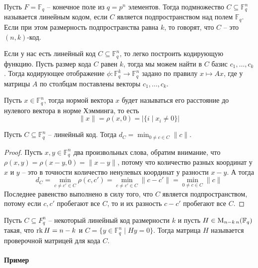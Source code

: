 \begin{definition}
Пусть $F = \mathbb F_q$ -- конечное поле из $q = p^n$ элементов.
Тогда подмножество $C\subseteq \mathbb F_q^n$ называется линейным кодом, если $C$ является подпространством над полем $\mathbb F_q$.
Если при этом размерность подпространства равна $k$, то говорят, что $C$ -- это $(n, k)$-код.
\end{definition}

Если у нас есть линейный код $C\subseteq \mathbb F_q^n$, то легко построить кодирующую функцию.
Пусть размер кода $C$ равен $k$, тогда мы можем найти в $C$ базис $c_1,\ldots,c_k$.
Тогда кодирующее отображение $\phi\colon \mathbb F_q^k \to \mathbb F_q^n$ задано по правилу $x \mapsto Ax$, где у матрицы $A$ по столбцам поставлены векторы $c_1,\ldots,c_k$.

\begin{definition}
Пусть $x\in \mathbb F_q^n$, тогда нормой вектора $x$ будет называться его расстояние до нулевого вектора в норме Хэмминга, то есть
\[
\|x\| = \rho(x, 0) = |\{i \mid x_i \neq 0\}|
\]
\end{definition}

\begin{claim}
Пусть $C\subseteq \mathbb F_q^n$ -- линейный код.
Тогда $d_C = \min_{0\neq c \in C}\|c\|$.
\end{claim}
\begin{proof}
Пусть $x,y\in \mathbb F_q^n$ два произвольных слова, обратим внимание, что $\rho(x,y) = \rho(x - y, 0) = \|x - y\|$, потому что количество разных координат у $x$ и $y$ -- это в точности количество ненулевых координат у разности $x-y$.
А тогда
\[
d_C = \min_{c \neq c'\in C}\rho(c,c') = \min_{c\neq c' \in C}\|c-c'\| = \min_{0\neq c\in C}\|c\|
\]
Последнее равенство выполнено в силу того, что $C$ является подпространством, потому если $c,c'$ пробегают все $C$, то и их разность $c-c'$ пробегают все $C$.
\end{proof}

\begin{definition}
Пусть $C\subseteq F_q^n$ -- некоторый линейный код размерности $k$ и пусть $H\in \MatrixFDim{\mathbb F_q}{n-k}{n}$ такая, что $\rk H = n - k$ и $C = \{y\in \mathbb F_q^n \mid Hy = 0\}$.
Тогда матрица $H$ называется проверочной матрицей для кода $C$.
\end{definition}

\paragraph{Пример}

